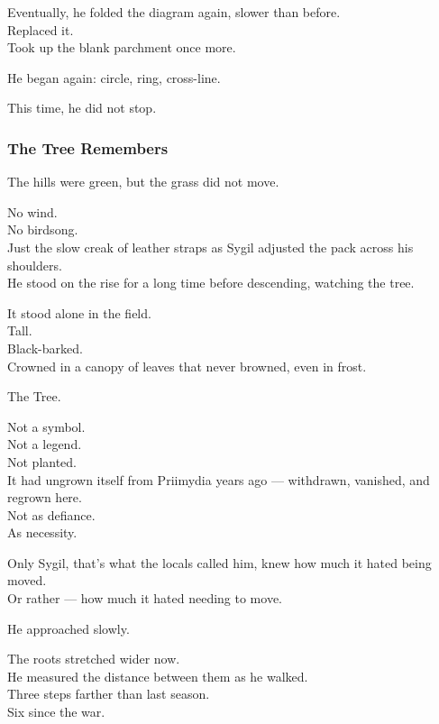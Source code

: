 \documentclass[12pt]{article}
\begin{document}
\vspace{1em}

Eventually, he folded the diagram again, slower than before.\\
Replaced it.\\
Took up the blank parchment once more.

He began again: circle, ring, cross-line.

\vspace{1em}

This time, he did not stop.

\dotfill

\subsubsection*{The Tree Remembers}

The hills were green, but the grass did not move.

No wind.\\
No birdsong.\\
Just the slow creak of leather straps as Sygil adjusted the pack across his shoulders.\\
He stood on the rise for a long time before descending, watching the tree.

It stood alone in the field.\\
Tall.\\
Black-barked.\\
Crowned in a canopy of leaves that never browned, even in frost.

The Tree.

Not a symbol.\\
Not a legend.\\
Not planted.\\
It had ungrown itself from Priimydia years ago — withdrawn, vanished, and regrown here.\\
Not as defiance.\\
As necessity.

Only Sygil, that’s what the locals called him, knew how much it hated being moved.\\
Or rather — how much it hated needing to move.

\vspace{1em}

He approached slowly.

The roots stretched wider now.\\
He measured the distance between them as he walked.\\
Three steps farther than last season.\\
Six since the war.
\end{document}
